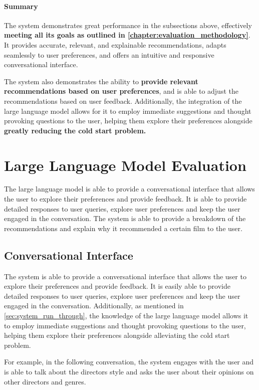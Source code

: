 \paragraph{Summary}
\label{sec:system_run_through_summary}
The system demonstrates great performance in the subsections above, effectively \textbf{meeting all its goals as outlined in \cref{chapter:evaluation_methodology}}. 
It provides accurate, relevant, and explainable recommendations, adapts seamlessly to user preferences, and offers an intuitive and responsive conversational interface.

The system also demonstrates the ability to \textbf{provide relevant recommendations based on user preferences}, and is able to adjust the recommendations based on user feedback. 
Additionally, the integration of the large language model allows for it to employ immediate suggestions and thought provoking questions to the user, helping them explore their preferences alongside \textbf{greatly reducing the cold start problem.}

\section{Large Language Model Evaluation}
\label{sec:large_language_model_evaluation_results}
The large language model is able to provide a conversational interface that allows the user to explore their preferences and provide feedback.
It is able to provide detailed responses to user queries, explore user preferences and keep the user engaged in the conversation.
The system is able to provide a breakdown of the recommendations and explain why it recommended a certain film to the user.

\subsection{Conversational Interface}
\label{sec:conversational_interface}
The system is able to provide a conversational interface that allows the user to explore their preferences and provide feedback.
It is easily able to provide detailed responses to user queries, explore user preferences and keep the user engaged in the conversation.
Additionally, as mentioned in \cref{sec:system_run_through}, the knowledge of the large language model allows it to employ immediate suggestions and thought provoking questions to the user, helping them explore their preferences alongside alleviating the cold start problem.

For example, in the following conversation, the system engages with the user and is able to talk about the directors style and asks the user about their opinions on other directors and genres.


